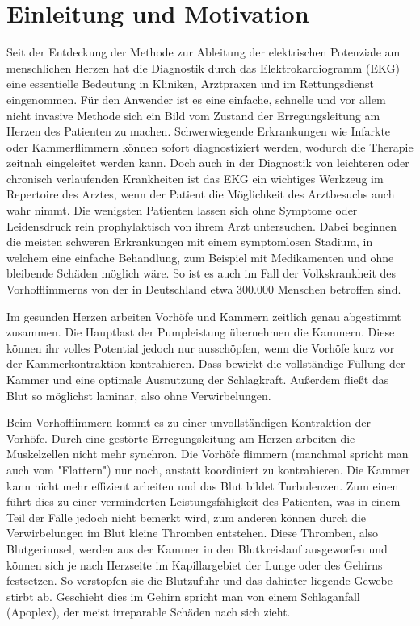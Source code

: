 
\section{Einleitung und Motivation}

Seit der Entdeckung der Methode zur Ableitung der elektrischen Potenziale am menschlichen Herzen hat die Diagnostik durch das Elektrokardiogramm (EKG) eine essentielle Bedeutung in Kliniken, Arztpraxen und im Rettungsdienst eingenommen. Für den Anwender ist es eine einfache, schnelle und vor allem nicht invasive Methode sich ein Bild vom Zustand der Erregungsleitung am Herzen des Patienten zu machen. Schwerwiegende Erkrankungen wie Infarkte oder Kammerflimmern können sofort diagnostiziert werden, wodurch die Therapie zeitnah eingeleitet werden kann. Doch auch in der Diagnostik von leichteren oder chronisch verlaufenden Krankheiten ist das EKG ein wichtiges Werkzeug im Repertoire des Arztes, wenn der Patient die Möglichkeit des Arztbesuchs auch wahr nimmt. Die wenigsten Patienten lassen sich ohne Symptome oder Leidensdruck rein prophylaktisch von ihrem Arzt untersuchen. Dabei beginnen die meisten schweren Erkrankungen mit einem symptomlosen Stadium, in welchem eine einfache Behandlung, zum Beispiel mit Medikamenten und ohne bleibende Schäden möglich wäre. So ist es auch im Fall der Volkskrankheit des Vorhofflimmerns von der in Deutschland etwa 300.000 Menschen betroffen sind. 

Im gesunden Herzen arbeiten Vorhöfe und Kammern zeitlich genau abgestimmt zusammen. Die Hauptlast der Pumpleistung übernehmen die Kammern. Diese können ihr volles Potential jedoch nur ausschöpfen, wenn die Vorhöfe kurz vor der Kammerkontraktion kontrahieren. Dass bewirkt die vollständige Füllung der Kammer und eine optimale Ausnutzung der Schlagkraft. Außerdem fließt das Blut so möglichst laminar, also ohne Verwirbelungen. 

Beim Vorhofflimmern kommt es zu einer unvollständigen Kontraktion der Vorhöfe. Durch eine gestörte Erregungsleitung am Herzen arbeiten die Muskelzellen nicht mehr synchron. Die Vorhöfe flimmern (manchmal spricht man auch vom "Flattern") nur noch, anstatt koordiniert zu kontrahieren. Die Kammer kann nicht mehr effizient arbeiten und das Blut bildet Turbulenzen. Zum einen führt dies zu einer verminderten Leistungsfähigkeit des Patienten, was in einem Teil der Fälle jedoch nicht bemerkt wird, zum anderen können durch die Verwirbelungen im Blut kleine Thromben entstehen. Diese Thromben, also Blutgerinnsel, werden aus der Kammer in den Blutkreislauf ausgeworfen und können sich je nach Herzseite im Kapillargebiet der Lunge oder des Gehirns festsetzen. So verstopfen sie die Blutzufuhr und das dahinter liegende Gewebe stirbt ab. Geschieht dies im Gehirn spricht man von einem Schlaganfall (Apoplex), der meist irreparable Schäden nach sich zieht. 

